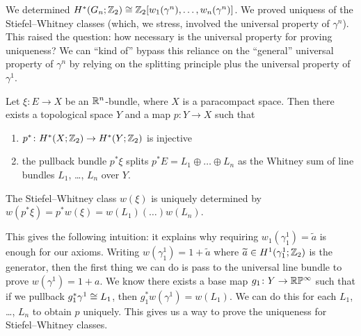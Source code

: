 
\lecture{}

\begin{recall}
We determined $H^{*}(G_{n};\mathbb{Z}_{2})\cong\mathbb{Z}_{2}[w_{1}(\gamma^{n}),\dots,w_{n}(\gamma^{n})]$.
We proved uniquess of the Stiefel--Whitney classes (which, we stress,
involved the universal property of $\gamma^{n}$). This raised the
question: how necessary is the universal property for proving
uniqueness? We can ``kind of'' bypass this reliance on the ``general''
universal property of $\gamma^{n}$ by relying on the splitting
principle plus the universal property of $\gamma^{1}$.
\end{recall}

\begin{theorem}
Let $\xi\colon E\to X$ be an $\mathbb{R}^{n}$-bundle, where $X$ is a
paracompact space. Then there exists a topological space $Y$ and a map
$p\colon Y\to X$ such that
\begin{enumerate}
\item $p^{*}\colon H^{*}(X;\mathbb{Z}_{2})\to H^{*}(Y;\mathbb{Z}_{2})$ is injective
\item the pullback bundle $p^{*}\xi$ splits
  $p^{*}E=L_{1}\oplus\dots\oplus L_{n}$ as the Whitney sum of line
  bundles $L_{1}$, \dots, $L_{n}$ over $Y$.
\end{enumerate}
\end{theorem}

\begin{corollary}
The Stiefel--Whitney class $w(\xi)$ is uniquely determined by $w(p^{*}\xi)=p^{*}w(\xi)=w(L_{1})(\dots)w(L_{n})$.
\end{corollary}

\begin{remark}
This gives the following intuition: it explains why requiring
$w_{1}(\gamma_{1}^{1})=\widetilde{a}$ is enough for our axioms. Writing
$w(\gamma_{1}^{1})=1+\widetilde{a}$ where $\widetilde{a}\in H^{1}(\gamma_{1}^{1};\mathbb{Z}_{2})$ is
the generator, then the first thing we can do is pass to the universal
line bundle to prove $w(\gamma^{1})=1+a$. We know there exists a base
map $g_{1}\colon Y\to\mathbb{R}\mathbb{P}^{\infty}$ such that if we pullback
$g_{1}^{*}\gamma^{1}\cong L_{1}$, then $g_{1}^{*}w(\gamma^{1})=w(L_{1})$.
We can do this for each $L_{1}$, \dots, $L_{n}$ to obtain $p$ uniquely.
This gives us a way to prove the uniqueness for Stiefel--Whitney classes.
\end{remark}

